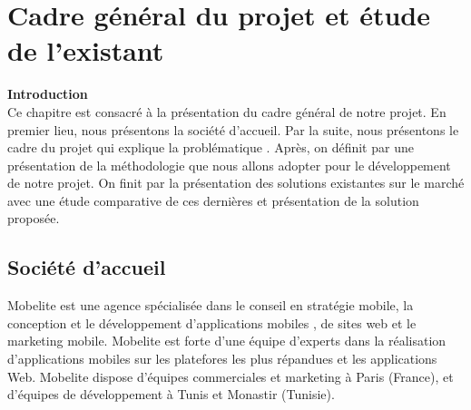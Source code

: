 

\chapter{\Large Cadre général du projet et étude de l'existant}


\textbf{\huge Introduction} \\[0.3cm]





  Ce chapitre est consacré à la présentation du cadre général de notre projet. En premier lieu, nous présentons la société d’accueil. Par la suite, nous présentons le cadre du projet qui explique la problématique . Après, on définit par une présentation de la méthodologie que nous allons adopter pour le développement de notre projet. On finit par la présentation des solutions existantes sur le marché avec une étude comparative de ces dernières et présentation de la solution proposée.



\section{\selectfont\Large Société d’accueil }
 Mobelite est une agence spécialisée dans le conseil en stratégie mobile, la conception et le développement d’applications mobiles , de sites web et le marketing mobile. Mobelite est forte d’une équipe d’experts dans la réalisation d’applications mobiles sur les platefores les plus répandues et les applications Web. Mobelite dispose d’équipes commerciales et marketing à Paris (France), et d’équipes de développement à Tunis et Monastir (Tunisie).
    

